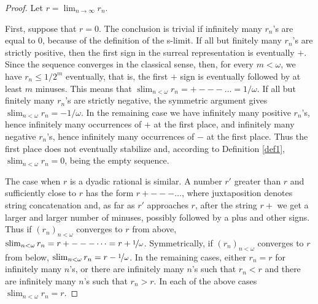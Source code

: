 \documentclass[12pt]{amsart}
\theoremstyle{definition}
\theoremstyle{remark}
\begin{document}
 \begin{proof}
Let $r=\lim_{n\to\infty}  r_n$.

First, suppose that  $r=0$.
The conclusion is trivial
if   infinitely many 
$r_n$'s are equal to $0$,
because of the definition of the s-limit. 
If all but finitely many 
$r_n$'s are
strictly positive, 
then the first sign in the surreal representation
is eventually $+$.
Since the sequence converges in the classical sense,
then, for every $m < \omega$,
we have $r_n \leq 1/2^m$  eventually, that is, 
the first $+$ sign is eventually followed by at least $m$ minuses.   
This means that  $\operatorname{slim}_{n < \omega } r_n = +---\dots = 1/ \omega $.
If all but finitely many 
$r_n$'s are
strictly negative, 
the symmetric argument gives 
$\operatorname{slim}_{n < \omega } r_n = -1/ \omega $. 
In the remaining case we have
infinitely many positive $r_n$'s, hence 
infinitely many occurrences of $+$ at the first place, and
 infinitely many negative $r_n$'s, hence 
infinitely many occurrences of $-$ at the first place.
Thus the first place does not eventually stabilize and,
according to
Definition \ref{def1},
$\operatorname{slim}_{n < \omega } r_n =0$,
being the empty sequence.
 
The case when $r$ is a dyadic rational is similar.
A number $r'$  greater than $r$ and sufficiently close to $r$ 
has the form $r+---\dots$, where juxtaposition denotes string concatenation
and, as far as $r'$ approaches $r$, after the string $r+$  
we get a larger and larger number
of minuses,   possibly followed by a plus and other 
signs.
Thus if $( r_n) _{n < \omega } $ converges to 
$r$ from above,  
$\operatorname{slim}_{n < \omega } r_n = r+---\dots = r+  \nicefrac{1}{ \omega}  $.
Symmetrically, 
if $( r_n) _{n < \omega } $ converges to 
$r$ from below,  
$\operatorname{slim}_{n < \omega } r_n  = r-  \nicefrac{1}{ \omega} $.
In the remaining cases, either  $r_n=r$ for infinitely many $n$'s,
or there are infinitely many  $n$'s such that  
$r_n<r$ and there are infinitely many  $n$'s such that  
$r_n>r$. In each of the above cases 
$\operatorname{slim}_{n < \omega } r_n =r$.


\end{proof}
\end{document}
